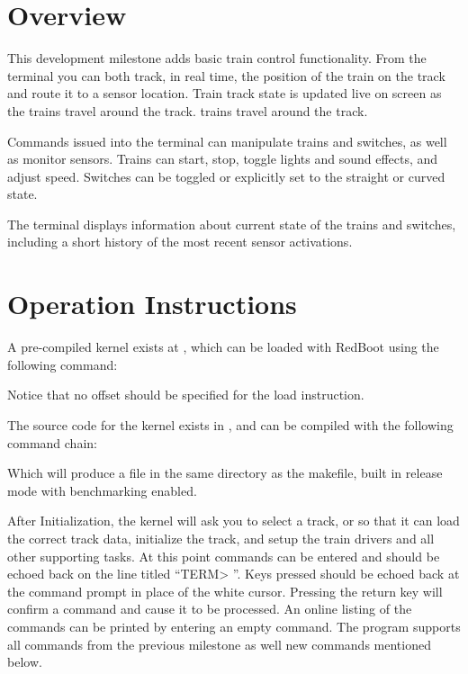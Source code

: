 \documentclass[pdftex,10pt,a4paper]{article}
\begin{document}

\section*{Overview}

This development milestone adds basic train control functionality.
From the terminal you can both track, in real time, the position of
the train on the track and route it to a sensor location. Train track
state is updated live on screen as the trains travel around the track.
trains travel around the track.

Commands issued into the terminal can manipulate trains and
switches, as well as monitor sensors. Trains can start, stop, toggle
lights and sound effects, and adjust speed. Switches can be toggled or
explicitly set to the straight or curved state.

The terminal displays information about current state
of the trains and switches, including a short history of the most
recent sensor activations.


\section*{Operation Instructions}

A pre-compiled kernel exists at
, which can be loaded with
RedBoot using the following command:

\begin{center}
\end{center}

Notice that no offset should be specified for the load instruction.

The source code for the kernel exists in ,
and can be compiled with the following command chain:

\begin{center}
\end{center}

Which will produce a  file in the same directory as
the makefile, built in release mode with benchmarking enabled.

After Initialization, the kernel will ask you to select a track,
 or  so that it can load the correct track data,
initialize the track, and setup the train drivers and all other
supporting tasks.  At this point commands can be entered and should be
echoed back on the line titled ``TERM> ''. Keys pressed should be
echoed back at the command prompt in place of the white
cursor. Pressing the return key will confirm a command and cause it to
be processed. An online listing of the commands can be printed by
entering an empty command. The program supports all commands from the
previous milestone as well new commands mentioned below.
\end{document}
